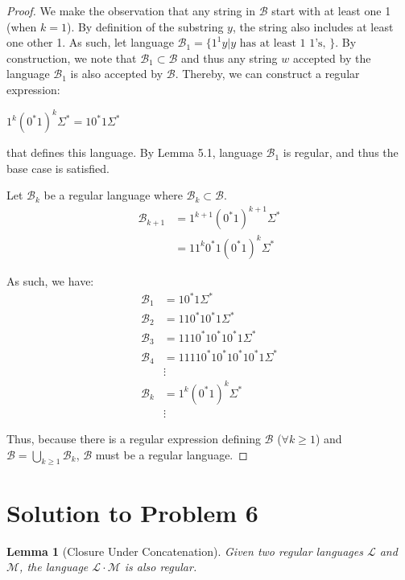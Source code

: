 \documentclass[11pt]{report}
\newcounter{problem}
\theoremstyle{definition}
\theoremstyle{plain}
\newtheorem{lemma}{Lemma}[problem]
\theoremstyle{plain}
\begin{document}
\begin{proof}
We make the observation that any string in $\mathcal{B}$ start with at least one 1 (when $k=1$). 
By definition of the substring $y$, the string also includes at least one other 1.
As such, let language $\mathcal{B}_{1}=\{1^{1}y|y \text{ has at least } 1 \text{ 1's, }\}$.
By construction, we note that $\mathcal{B}_{1} \subset \mathcal{B}$ and thus 
any string $w$ accepted by the language $\mathcal{B}_{1}$ is also accepted by $\mathcal{B}$.
Thereby, we can construct a regular expression: 
\begin{center}
$1^{k}(0^{*}1)^{k}\Sigma^{*} = 10^{*}1\Sigma^{*}$
\end{center}
that defines this language.
By Lemma 5.1, language $\mathcal{B}_{1}$ is regular, and thus the base case is satisfied. \newline

\noindent Let $\mathcal{B}_{k}$ be a regular language where $\mathcal{B}_{k} \subset \mathcal{B}$.
\begin{align*}
\mathcal{B}_{k+1} &= 1^{k+1}(0^{*}1)^{k+1}\Sigma^{*} \\
&= 11^{k}0^{*}1(0^{*}1)^{k}\Sigma^{*}
\end{align*}

\noindent As such, we have:
\begin{align*}
\mathcal{B}_{1} &= 10^{*}1\Sigma^{*} \\
\mathcal{B}_{2} &= 110^{*}10^{*}1\Sigma^{*} \\
\mathcal{B}_{3} &= 1110^{*}10^{*}10^{*}1\Sigma^{*} \\
\mathcal{B}_{4} &= 11110^{*}10^{*}10^{*}10^{*}1\Sigma^{*} \\
&\vdots \\
\mathcal{B}_{k} &= 1^{k}(0^{*}1)^{k}\Sigma^{*} \\
&\vdots
\end{align*}

\noindent Thus, because there is a regular expression defining $\mathcal{B}$ ($\forall k \geq 1$) 
and $\mathcal{B} = \underset{k \geq 1}{\bigcup} \mathcal{B}_{k}$,
$\mathcal{B}$ must be a regular language.
\end{proof}

\pagebreak

\section*{Solution to Problem 6}

\begin{lemma}[Closure Under Concatenation]
Given two regular languages $\mathcal{L}$ and $\mathcal{M}$, 
the language $\mathcal{L} \cdot \mathcal{M}$ is also regular. 
\end{lemma}
\end{document}
